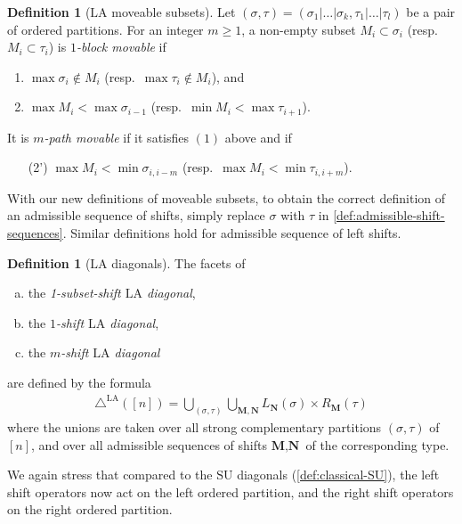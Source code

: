 \documentclass{amsart}
\theoremstyle{definition}
\newtheorem{definition}[theorem]{Definition}
\newcommand{\SU}{\mathrm{SU}}
\newcommand{\LA}{\mathrm{LA}}
\newcommand{\LAD}{\triangle^{\mathrm{LA}}}
\begin{document}
\begin{definition}[$\LA$ moveable subsets]
\label{def:LAD movable-subsets}
Let $(\sigma,\tau) = (\sigma_1|\dots|\sigma_k,\tau_1|\dots|\tau_l)$ be a pair of ordered partitions.
For an integer $m\geq 1$, a non-empty subset $M_i \subset \sigma_i$ (resp.~$M_{i}\subset \tau_{i}$) is \emph{$1$-block movable} if 
\begin{enumerate}
    \item $\max \sigma_i \notin M_i$ (resp.~$\max \tau_{i} \notin M_i$), and
    \item $\max M_i < \max \sigma_{i-1}$ (resp.~$\min M_{i} < \max \tau_{i+1}$).
\end{enumerate}
It is \emph{$m$-path movable} if it satisfies $(1)$ above and if
\begin{enumerate}
    \item[(2')] $\max M_i < \min \sigma_{i,i-m}$ (resp.~$\max M_{i} < \min \tau_{i,i+m}$).
\end{enumerate}
\end{definition}
With our new definitions of moveable subsets, to obtain the correct definition of an admissible sequence of shifts, simply replace $\sigma$ with $\tau$ in \cref{def:admissible-shift-sequences}. 
Similar definitions hold for admissible sequence of left shifts.

\begin{definition}[$\LA$ diagonals]
    \label{def:shift-LA}
   The facets of 
   \begin{enumerate}[(a)]
    \item the \emph{1-subset-shift $\LA$ diagonal},
    \item the \emph{$1$-shift $\LA$ diagonal},
    \item the \emph{$m$-shift $\LA$ diagonal}
   \end{enumerate}
   are defined by the formula
    \begin{align*}
        \LAD([n]) = \bigcup_{(\sigma,\tau)} \bigcup_{\mathbf{M}, \mathbf{N}} L_\mathbf{N}(\sigma)\times R_\mathbf{M}(\tau)
    \end{align*}
    where the unions are taken over all strong complementary partitions $(\sigma, \tau)$ of $[n]$, and over all admissible sequences of shifts $\textbf{M},\textbf{N}$ of the corresponding type.
\end{definition}

We again stress that compared to the $\SU$ diagonals (\cref{def:classical-SU}), the left shift operators now act on the left ordered partition, and the right shift operators on the right ordered partition.
\end{document}
